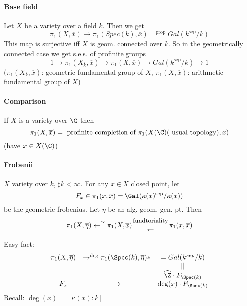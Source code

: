 \paragraph{Base field} Let $X$ be a variety over a field $k$. Then we get 	
	$$\pi_1(X, \overline x) \to \pi_1(Spec(k), \overline x) =^{\text{prop}} Gal(k^{\text{sep}}/k)$$
	This map is surjective iff $X$ is geom. connected over $k$.
	So in the geometrically connected case we get s.e.s. of profinite groups 
	$$1 \to \pi_1(X_{\overline k}, \overline x)\to \pi_1(X, \overline x)\to Gal(k^{\text{sep}}/k)\to 1$$
	($\pi_1(X_{\overline k}, \overline x)$: geometric fundamental group of $X$, $\pi_1(X, \overline x)$: arithmetic fundamental group of $X$)
	
\paragraph{Comparison} If $X$ is a variety over $\C$ then 
$$\pi_1(X, \overline x)=\text{ profinite completion of }\pi_1(X(\C)(\text{ usual topology}), x)$$
(have $x\in X(\C)$)

\paragraph{Frobenii} $X$ variety over $k$, $\sharp k<\infty$. For any $x\in X$ closed point, let 
	$$F_x\in \pi_1(x, \overline x)=\Gal(\kappa(x)^{\text{sep}}/\kappa(x))$$ be the geometric frobenius. Let $\overline\eta$ be an alg. geom. gen. pt. Then
		$$\pi_1(X, \overline\eta) \leftarrow^{\cong}\pi_1(X, \overline x) {\text{\small fundtoriality}\atop\leftarrow}\pi_1(x, \overline x)$$
		
\noindent
Easy fact: 
	$$\begin{array}{cccccccc}
	\pi_1(X, \overline \eta) & \to^{\deg} \pi_1(\Spec(k), \overline \eta) * & = Gal(k^{sep}/k)\\
	& & ||\\
	& & \widehat\Z\cdot F_{\Spec(k)}\\
	F_x & \mapsto & \deg(x)\cdot F_{\Spec(k)}
	\end{array}$$
	Recall: $\deg(x) = [\kappa(x):k]$

